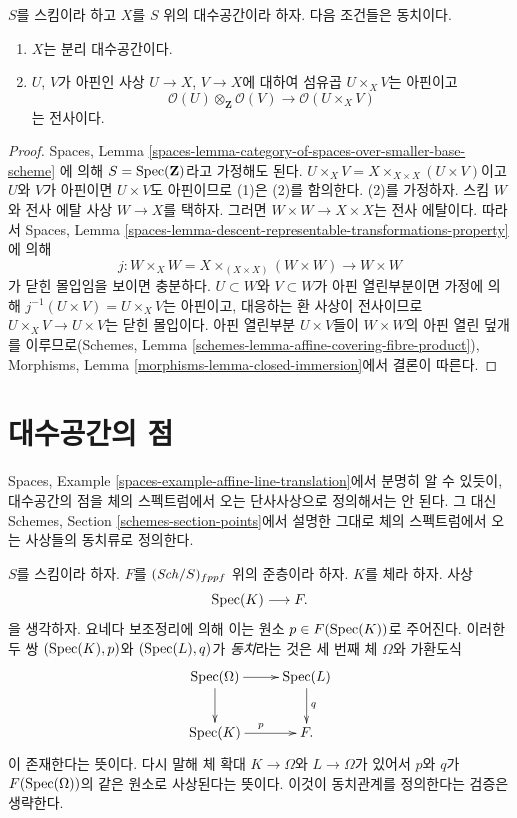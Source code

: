 \begin{lemma}
\label{lemma-characterize-separated}
$S$를 스킴이라 하고 $X$를 $S$ 위의 대수공간이라 하자.
다음 조건들은 동치이다.
\begin{enumerate}
\item $X$는 분리 대수공간이다.
\item $U$, $V$가 아핀인 사상 $U \to X$, $V \to X$에 대하여
섬유곱 $U \times_X V$는 아핀이고
$$
\mathcal{O}(U) \otimes_\mathbf{Z} \mathcal{O}(V)
\longrightarrow
\mathcal{O}(U \times_X V)
$$
는 전사이다.
\end{enumerate}
\end{lemma}

\begin{proof}
Spaces, Lemma
\ref{spaces-lemma-category-of-spaces-over-smaller-base-scheme}
에 의해 $S = \mathop{\mathrm{Spec}}(\mathbf{Z})$라고 가정해도 된다.
$U \times_X V = X \times_{X \times X} (U \times V)$이고
$U$와 $V$가 아핀이면 $U \times V$도 아핀이므로
(1)은 (2)를 함의한다. (2)를 가정하자. 스킴 $W$와
전사 에탈 사상 $W \to X$를 택하자. 그러면
$W \times W \to X \times X$는 전사 에탈이다.
따라서 Spaces, Lemma
\ref{spaces-lemma-descent-representable-transformations-property}
에 의해
$$
j : W \times_X W = X \times_{(X \times X)} (W \times W) \to W \times W
$$
가 닫힌 몰입임을 보이면 충분하다.
$U \subset W$와 $V \subset W$가 아핀 열린부분이면
가정에 의해 $j^{-1}(U \times V) = U \times_X V$는 아핀이고,
대응하는 환 사상이 전사이므로 $U \times_X V \to U \times V$는
닫힌 몰입이다. 아핀 열린부분 $U \times V$들이 $W \times W$의
아핀 열린 덮개를 이루므로(Schemes, Lemma
\ref{schemes-lemma-affine-covering-fibre-product}),
Morphisms, Lemma
\ref{morphisms-lemma-closed-immersion}에서 결론이 따른다.
\end{proof}


\section{대수공간의 점}
\label{section-points}

\noindent
Spaces, Example \ref{spaces-example-affine-line-translation}에서
분명히 알 수 있듯이, 대수공간의 점을 체의 스펙트럼에서 오는
단사사상으로 정의해서는 안 된다.
그 대신 Schemes, Section \ref{schemes-section-points}에서
설명한 그대로 체의 스펙트럼에서 오는 사상들의 동치류로 정의한다.

\medskip\noindent
$S$를 스킴이라 하자.
$F$를 $(\mathit{Sch}/S)_{fppf}$ 위의 준층이라 하자.
$K$를 체라 하자. 사상
$$
\mathop{\mathrm{Spec}}(K) \longrightarrow F.
$$
을 생각하자. 요네다 보조정리에 의해 이는 원소
$p \in F(\mathop{\mathrm{Spec}}(K))$로 주어진다. 이러한 두 쌍
$(\mathop{\mathrm{Spec}}(K), p)$와 $(\mathop{\mathrm{Spec}}(L), q)$가 {\it 동치}라는 것은
세 번째 체 $\Omega$와 가환도식
$$
\xymatrix{
\Spec(\Omega) \ar[r] \ar[d] &
\Spec(L) \ar[d]^q \\
\Spec(K) \ar[r]^p &
F.
}
$$
이 존재한다는 뜻이다. 다시 말해 체 확대
$K \to \Omega$와 $L \to \Omega$가 있어서
$p$와 $q$가 $F(\mathop{\mathrm{Spec}}(\Omega))$의 같은 원소로 사상된다는
뜻이다. 이것이 동치관계를 정의한다는 검증은 생략한다.

